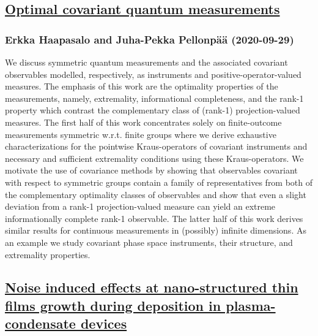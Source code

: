 \subsection*{\href{http://arxiv.org/abs/2009.14080v1}{Optimal covariant quantum measurements}}
\subsubsection*{Erkka Haapasalo and Juha-Pekka Pellonpää (2020-09-29)}
We discuss symmetric quantum measurements and the associated covariant
observables modelled, respectively, as instruments and positive-operator-valued
measures. The emphasis of this work are the optimality properties of the
measurements, namely, extremality, informational completeness, and the rank-1
property which contrast the complementary class of (rank-1) projection-valued
measures. The first half of this work concentrates solely on finite-outcome
measurements symmetric w.r.t. finite groups where we derive exhaustive
characterizations for the pointwise Kraus-operators of covariant instruments
and necessary and sufficient extremality conditions using these
Kraus-operators. We motivate the use of covariance methods by showing that
observables covariant with respect to symmetric groups contain a family of
representatives from both of the complementary optimality classes of
observables and show that even a slight deviation from a rank-1
projection-valued measure can yield an extreme informationally complete rank-1
observable. The latter half of this work derives similar results for continuous
measurements in (possibly) infinite dimensions. As an example we study
covariant phase space instruments, their structure, and extremality properties.

\subsection*{\href{http://arxiv.org/abs/2009.14076v1}{Noise induced effects at nano-structured thin films growth during  deposition in plasma-condensate devices}}
